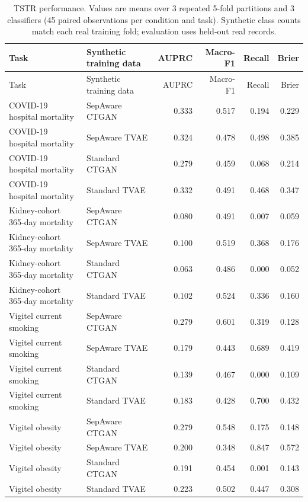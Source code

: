 \begin{longtable}{p{}p{}rrrr}
\caption{TSTR performance. Values are means over 3 repeated 5-fold partitions and 3 classifiers (45 paired observations per condition and task). Synthetic class counts match each real training fold; evaluation uses held-out real records.}\label{tab:tstr-summary}\\
\toprule
Task & Synthetic training data & AUPRC & Macro-F1 & Recall & Brier \\
\midrule
\endfirsthead
\toprule
Task & Synthetic training data & AUPRC & Macro-F1 & Recall & Brier \\
\midrule
\endhead
COVID-19 hospital mortality & SepAware CTGAN & 0.333 & 0.517 & 0.194 & 0.229 \\
COVID-19 hospital mortality & SepAware TVAE & 0.324 & 0.478 & 0.498 & 0.385 \\
COVID-19 hospital mortality & Standard CTGAN & 0.279 & 0.459 & 0.068 & 0.214 \\
COVID-19 hospital mortality & Standard TVAE & 0.332 & 0.491 & 0.468 & 0.347 \\
Kidney-cohort 365-day mortality & SepAware CTGAN & 0.080 & 0.491 & 0.007 & 0.059 \\
Kidney-cohort 365-day mortality & SepAware TVAE & 0.100 & 0.519 & 0.368 & 0.176 \\
Kidney-cohort 365-day mortality & Standard CTGAN & 0.063 & 0.486 & 0.000 & 0.052 \\
Kidney-cohort 365-day mortality & Standard TVAE & 0.102 & 0.524 & 0.336 & 0.160 \\
Vigitel current smoking & SepAware CTGAN & 0.279 & 0.601 & 0.319 & 0.128 \\
Vigitel current smoking & SepAware TVAE & 0.179 & 0.443 & 0.689 & 0.419 \\
Vigitel current smoking & Standard CTGAN & 0.139 & 0.467 & 0.000 & 0.109 \\
Vigitel current smoking & Standard TVAE & 0.183 & 0.428 & 0.700 & 0.432 \\
Vigitel obesity & SepAware CTGAN & 0.279 & 0.548 & 0.175 & 0.148 \\
Vigitel obesity & SepAware TVAE & 0.200 & 0.348 & 0.847 & 0.572 \\
Vigitel obesity & Standard CTGAN & 0.191 & 0.454 & 0.001 & 0.143 \\
Vigitel obesity & Standard TVAE & 0.223 & 0.502 & 0.447 & 0.308 \\
\bottomrule
\end{longtable}
